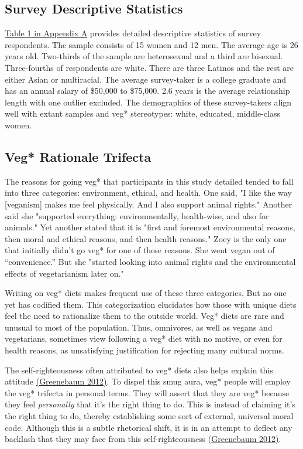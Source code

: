 \documentclass[twoside]{report}
\begin{document}
\subsection{Survey Descriptive Statistics}

\hyperlink{appendix-a}{Table 1 in Appendix A} provides detailed descriptive statistics of survey respondents. The sample consists of 15 women and 12 men. The average age is 26 years old. Two-thirds of the sample are heterosexual and a third are bisexual. Three-fourths of respondents are white. There are three Latinos and the rest are either Asian or multiracial. The average survey-taker is a college graduate and has an annual salary of \$50,000 to \$75,000. 2.6 years is the average relationship length with one outlier excluded. The demographics of these survey-takers align well with extant samples and veg* stereotypes: white, educated, middle-class women.

\subsection{Veg* Rationale Trifecta}

The reasons for going veg* that participants in this study detailed tended to fall into three categories: environment, ethical, and health. One said, "I like the way {[}veganism{]} makes me feel physically. And I also support animal rights." Another said she "supported everything: environmentally, health-wise, and also for animals." Yet another stated that it is "first and foremost environmental reasons, then moral and ethical reasons, and then health reasons." Zoey is the only one that initially didn't go veg* for one of these reasons. She went vegan out of ``convenience.'' But she "started looking into animal rights and the environmental effects of vegetarianism later on."

Writing on veg* diets makes frequent use of these three categories. But no one yet has codified them. This categorization elucidates how those with unique diets feel the need to rationalize them to the outside world. Veg* diets are rare and unusual to most of the population. Thus, omnivores, as well as vegans and vegetarians, sometimes view following a veg* diet with no motive, or even for health reasons, as unsatisfying justification for rejecting many cultural norms.

The self-righteousness often attributed to veg* diets also helps explain this attitude \hyperlink{greenebaum}{(Greenebaum 2012)}. To dispel this smug aura, veg* people will employ the veg* trifecta in personal terms. They will assert that they are veg* because they feel \emph{personally} that it's the right thing to do. This is instead of claiming it's the right thing to do, thereby establishing some sort of external, universal moral code. Although this is a subtle rhetorical shift, it is in an attempt to deflect any backlash that they may face from this self-righteousness (\hyperlink{greenebaum}{Greenebaum 2012)}.
\end{document}
